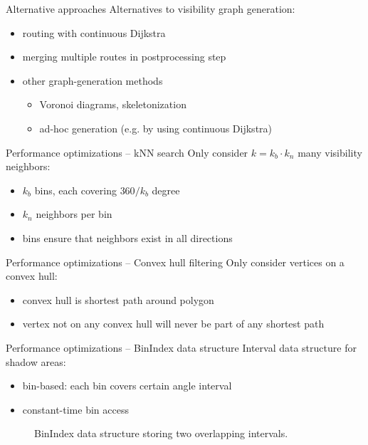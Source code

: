 \documentclass[xcolor={x11names}]{beamer}
\renewcommand{\n}{\hfill\\[0.5ex]}
\newenvironment{figcenter}
{%
	\parskip=0pt%
	\par%
	\nopagebreak%
	\centering%
}%
{%
	\par%
	\noindent%
	\ignorespacesafterend%
}
\newcommand{\startBackupSlides}
{
	\appendix
	\renewcommand*\insertshorttitle
	{
		\makebox[0.94\textwidth]{\oldmacro\hfill Appendix -- (\insertframenumber)\,/\,\inserttotalframenumber}
	}
}
\begin{document}
	\startBackupSlides
	
	\begin{frame}{Alternative approaches}
		Alternatives to visibility graph generation:\n
		\begin{itemize}
			\item routing with continuous Dijkstra
			\item merging multiple routes in postprocessing step
			\item other graph-generation methods
			\begin{itemize}
				\item Voronoi diagrams, skeletonization
				\item ad-hoc generation (e.g. by using continuous Dijkstra)
			\end{itemize}
		\end{itemize}
	\end{frame}
	
	\begin{frame}{Performance optimizations -- kNN search}
		Only consider $k = k_b \cdot k_n$ many visibility neighbors:
		\begin{itemize}
			\item $k_b$ bins, each covering $360 / k_b$ degree
			\item $k_n$ neighbors per bin
			\item bins ensure that neighbors exist in all directions
		\end{itemize}
	\end{frame}
	
	\begin{frame}{Performance optimizations -- Convex hull filtering}
		Only consider vertices on a convex hull:\n
		\begin{itemize}
			\item convex hull is shortest path around polygon
			\item[\textrightarrow\hspace{-0.1cm}] vertex not on any convex hull will never be part of any shortest path
		\end{itemize}
	\end{frame}
	
	\begin{frame}{Performance optimizations -- BinIndex data structure}
		Interval data structure for shadow areas:\n
		\begin{itemize}
			\item bin-based: each bin covers certain angle interval
			\item constant-time bin access
		\end{itemize}
		\begin{figure}[b]
			\begin{figcenter}
				\scalebox{0.7}
				{
					
				}
			\end{figcenter}
			\caption{BinIndex data structure storing two overlapping intervals.}
		\end{figure}
	\end{frame}
	
\end{document}
